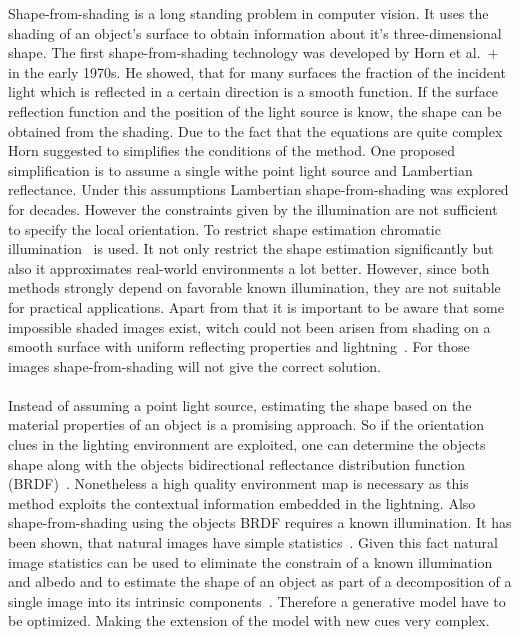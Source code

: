 	Shape-from-shading is a long standing problem in computer vision. It uses the shading of an object's surface to obtain information about it's three-dimensional shape. The first shape-from-shading technology was developed by Horn et al.~\cite{Horn_SHAPE_FROM_SHADING_1970}+ in the early 1970s. He showed, that for many surfaces the fraction of the incident light which is reflected in a certain direction is a smooth function. If the surface reflection function and the position of the light source is know, the shape can be obtained from the shading. Due to the fact that the equations are quite complex Horn suggested to simplifies the conditions of the method. One proposed simplification is to assume a single withe point light source and Lambertian reflectance. Under this assumptions Lambertian shape-from-shading was explored for decades. However the constraints given by the illumination are not sufficient to specify the local orientation. To restrict shape estimation chromatic illumination~\cite{Shape_from_shading_under_complex_natural_illumination, Shape_estimation_in_natural_illumination} is used. It not only restrict the shape estimation significantly but also it approximates real-world environments a lot better. However, since both methods strongly depend on favorable known illumination, they are not suitable for practical applications. Apart from that it is important to be aware that  some impossible shaded images exist, witch could not been arisen from shading on a smooth surface with uniform reflecting properties and lightning~\cite{Impossible_shaded_images}. For those images shape-from-shading will not give the correct solution.
	\\ \\
	Instead of assuming a point light source, estimating the shape based on the material properties of an object is a promising approach. So if the orientation clues in the lighting environment are exploited, one can determine the objects shape along with the objects bidirectional reflectance distribution function (BRDF)~\cite{BRDF_Shape_and_reflectance_from_natural_illumination}. Nonetheless a high quality environment map is necessary as this method exploits the contextual information embedded in the lightning. Also shape-from-shading using the objects BRDF requires a known illumination. It has been shown, that natural images have simple statistics~\cite{Statistics_of_Natural_Image_Wood, Relations_between_the_statistics_of_natural_images}. Given this fact natural image statistics can be used to eliminate the constrain of a known illumination and albedo and to estimate the shape of an object as part of a decomposition of a single image into its intrinsic components~\cite{Shape_albedo_and_illumination_from_a_single_image}. Therefore a generative model have to be optimized. Making the extension of the model with new cues very complex. 


